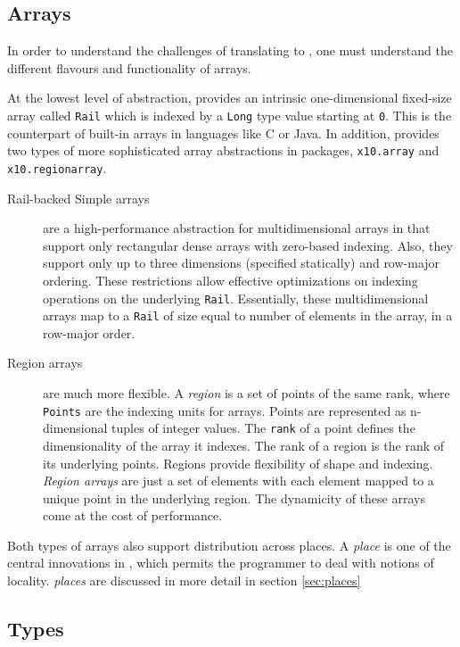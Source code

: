 \subsection{Arrays}\label{subsec:ArrayDesc}

In order to understand the challenges of translating \matlab to \xten,
one must understand the different flavours and functionality of \xten
arrays.

At the lowest level of abstraction, \xten provides an intrinsic
one-dimensional fixed-size array  called \verb|Rail| which is indexed by
a \verb|Long| type value starting at \verb|0|.  This is the \xten
counterpart of built-in arrays in languages like C or Java.  In
addition, \xten provides two types of more sophisticated array
abstractions in packages, \verb|x10.array| and \verb|x10.regionarray|.

\begin{description}
\item[Rail-backed Simple arrays] are a high-performance abstraction for
multidimensional arrays in \xten that support only rectangular dense
arrays with zero-based indexing. Also, they support only up to three
dimensions (specified statically) and row-major ordering. These
restrictions allow effective optimizations on indexing operations on the
underlying \verb|Rail|.  Essentially, these multidimensional arrays map
to a \verb|Rail| of size equal to number of elements in the array, in a
row-major order.

\item[Region arrays] are much more flexible.  A \emph{region} is a
set of points of the same rank, where \texttt{Points} are the indexing
units for arrays. Points are represented as n-dimensional tuples of
integer values. The \verb|rank| of a point defines the dimensionality of
the array it indexes.  The rank of a region is the rank of its
underlying points.  Regions provide flexibility of shape and indexing.
\emph{Region arrays} are just a set of elements with each element mapped
to a unique point in the underlying region. The dynamicity of these
arrays come at the cost of performance.

\end{description}
Both types of arrays also support distribution across places.  A
\emph{place} is one of the central innovations in \xten, which permits
the programmer to deal with notions of locality. \emph{places} are discussed in
more detail in section \ref{sec:places}


\subsection{Types}


